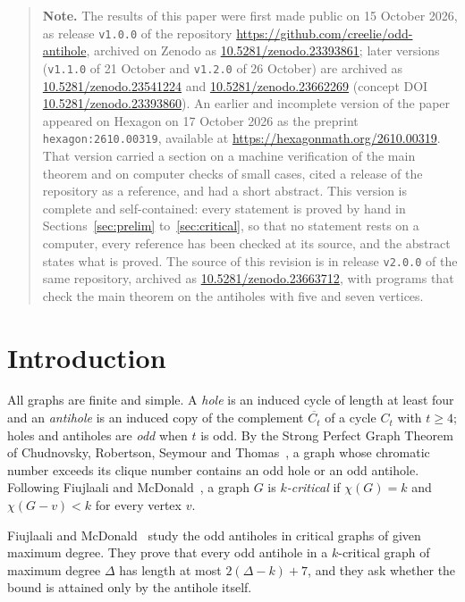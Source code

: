 \documentclass[11pt,a4paper,reqno]{amsart}
\theoremstyle{definition}
\theoremstyle{remark}
\newcommand{\cbar}[1]{\overline{C_{#1}}}
\begin{document}
\medskip
\begin{quote}
\small\sloppy
\noindent\textbf{Note.} The results of this paper were first made public on 15 October 2026, as release \texttt{v1.0.0} of the repository \url{https://github.com/creelie/odd-antihole}, archived on Zenodo as \href{https://doi.org/10.5281/zenodo.23393861}{10.5281/zenodo.23393861}; later versions (\texttt{v1.1.0} of 21 October and \texttt{v1.2.0} of 26 October) are archived as \href{https://doi.org/10.5281/zenodo.23541224}{10.5281/zenodo.23541224} and \href{https://doi.org/10.5281/zenodo.23662269}{10.5281/zenodo.23662269} (concept DOI \href{https://doi.org/10.5281/zenodo.23393860}{10.5281/zenodo.23393860}). An earlier and incomplete version of the paper appeared on Hexagon on 17 October 2026 as the preprint \texttt{hexagon:2610.00319}, available at \url{https://hexagonmath.org/2610.00319}. That version carried a section on a machine verification of the main theorem and on computer checks of small cases, cited a release of the repository as a reference, and had a short abstract. This version is complete and self-contained: every statement is proved by hand in Sections~\ref{sec:prelim} to~\ref{sec:critical}, so that no statement rests on a computer, every reference has been checked at its source, and the abstract states what is proved. The source of this revision is in release \texttt{v2.0.0} of the same repository, archived as \href{https://doi.org/10.5281/zenodo.23663712}{10.5281/zenodo.23663712}, with programs that check the main theorem on the antiholes with five and seven vertices.
\end{quote}

\section{Introduction}

All graphs are finite and simple. A \emph{hole} is an induced cycle of length at least four and an \emph{antihole} is an induced copy of the complement $\cbar{t}$ of a cycle $C_t$ with $t\ge4$; holes and antiholes are \emph{odd} when $t$ is odd. By the Strong Perfect Graph Theorem of Chudnovsky, Robertson, Seymour and Thomas~\cite{CRST}, a graph whose chromatic number exceeds its clique number contains an odd hole or an odd antihole. Following Fiujlaali and McDonald~\cite{FM}, a graph $G$ is \emph{$k$-critical} if $\chi(G)=k$ and $\chi(G-v)<k$ for every vertex $v$.

Fiujlaali and McDonald~\cite{FM} study the odd antiholes in critical graphs of given maximum degree. They prove that every odd antihole in a $k$-critical graph of maximum degree $\Delta$ has length at most $2(\Delta-k)+7$, and they ask whether the bound is attained only by the antihole itself.
\end{document}

